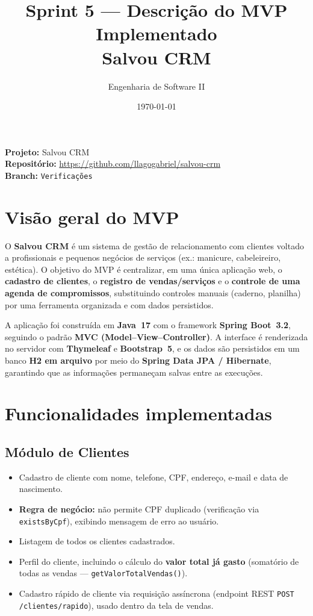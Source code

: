 \documentclass[12pt,a4paper]{article}
\title{\textbf{Sprint 5 --- Descrição do MVP Implementado}\\[4pt]
\large Salvou CRM}
\author{Engenharia de Software II}
\date{\today}
\begin{document}
\maketitle

\begin{flushleft}
\textbf{Projeto:} Salvou CRM \\
\textbf{Repositório:} \url{https://github.com/llagogabriel/salvou-crm} \\
\textbf{Branch:} \texttt{Verificações}
\end{flushleft}

\hrulefill

\section{Visão geral do MVP}

O \textbf{Salvou CRM} é um sistema de gestão de relacionamento com clientes voltado a
profissionais e pequenos negócios de serviços (ex.: manicure, cabeleireiro, estética).
O objetivo do MVP é centralizar, em uma única aplicação web, o \textbf{cadastro de
clientes}, o \textbf{registro de vendas/serviços} e o \textbf{controle de uma agenda de
compromissos}, substituindo controles manuais (caderno, planilha) por uma ferramenta
organizada e com dados persistidos.

A aplicação foi construída em \textbf{Java~17} com o framework \textbf{Spring Boot~3.2},
seguindo o padrão \textbf{MVC (Model--View--Controller)}. A interface é renderizada no
servidor com \textbf{Thymeleaf} e \textbf{Bootstrap~5}, e os dados são persistidos em um
banco \textbf{H2 em arquivo} por meio do \textbf{Spring Data JPA / Hibernate}, garantindo
que as informações permaneçam salvas entre as execuções.

\section{Funcionalidades implementadas}

\subsection{Módulo de Clientes}
\begin{itemize}[leftmargin=*]
  \item Cadastro de cliente com nome, telefone, CPF, endereço, e-mail e data de nascimento.
  \item \textbf{Regra de negócio:} não permite CPF duplicado (verificação via
        \texttt{existsByCpf}), exibindo mensagem de erro ao usuário.
  \item Listagem de todos os clientes cadastrados.
  \item Perfil do cliente, incluindo o cálculo do \textbf{valor total já gasto}
        (somatório de todas as vendas --- \texttt{getValorTotalVendas()}).
  \item Cadastro rápido de cliente via requisição assíncrona (endpoint REST
        \texttt{POST /clientes/rapido}), usado dentro da tela de vendas.
\end{itemize}
\end{document}
